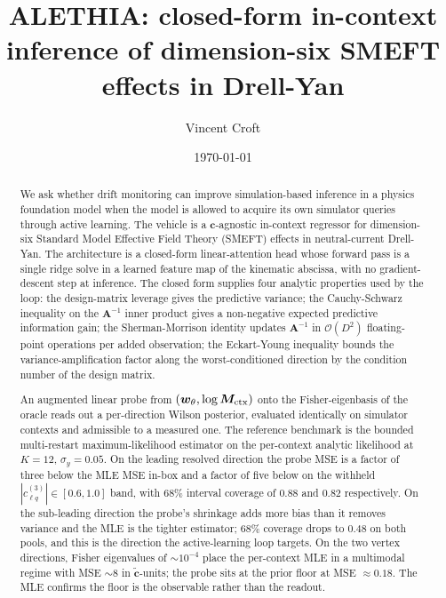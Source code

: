 \documentclass[11pt,a4paper]{article}
\title{\bfseries ALETHIA: closed-form in-context inference of dimension-six SMEFT effects in Drell-Yan}
\author{Vincent Croft}
\date{\today}
\begin{document}
\maketitle

\begin{abstract}
\noindent
We ask whether drift monitoring can improve simulation-based inference in a physics foundation model when the model is allowed to acquire its own simulator queries through active learning. The vehicle is a $\bm{c}$-agnostic in-context regressor for dimension-six Standard Model Effective Field Theory (SMEFT) effects in neutral-current Drell-Yan. The architecture is a closed-form linear-attention head whose forward pass is a single ridge solve in a learned feature map of the kinematic abscissa, with no gradient-descent step at inference. The closed form supplies four analytic properties used by the loop: the design-matrix leverage gives the predictive variance; the Cauchy-Schwarz inequality on the $\bm{A}^{-1}$ inner product gives a non-negative expected predictive information gain; the Sherman-Morrison identity updates $\bm{A}^{-1}$ in $\mathcal{O}(D^2)$ floating-point operations per added observation; the Eckart-Young inequality bounds the variance-amplification factor along the worst-conditioned direction by the condition number of the design matrix.

An augmented linear probe from $(\bm{w}_\theta, \log \bm{M}_{\rm ctx})$ onto the Fisher-eigenbasis of the oracle reads out a per-direction Wilson posterior, evaluated identically on simulator contexts and admissible to a measured one. The reference benchmark is the bounded multi-restart maximum-likelihood estimator on the per-context analytic likelihood at $K = 12$, $\sigma_y = 0.05$. On the leading resolved direction the probe MSE is a factor of three below the MLE MSE in-box and a factor of five below on the withheld $|c_{\ell q}^{(3)}| \in [0.6, 1.0]$ band, with $68\%$ interval coverage of $0.88$ and $0.82$ respectively. On the sub-leading direction the probe's shrinkage adds more bias than it removes variance and the MLE is the tighter estimator; $68\%$ coverage drops to $0.48$ on both pools, and this is the direction the active-learning loop targets. On the two vertex directions, Fisher eigenvalues of $\sim 10^{-4}$ place the per-context MLE in a multimodal regime with MSE $\sim 8$ in $\tilde{\bm{c}}$-units; the probe sits at the prior floor at MSE $\approx 0.18$. The MLE confirms the floor is the observable rather than the readout.


\end{abstract}
\end{document}
